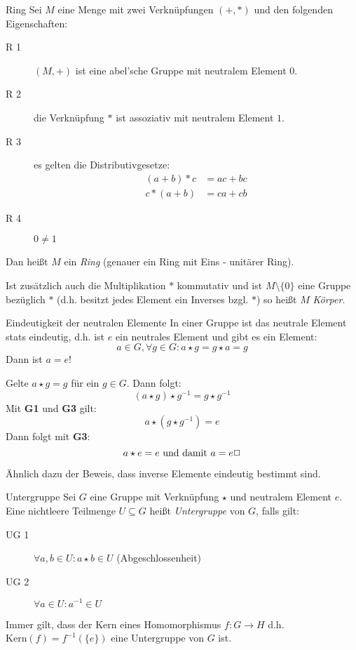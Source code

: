 \begin{definition}{Ring}
	Sei $M$ eine Menge mit zwei Verknüpfungen $(+,*)$ und den folgenden Eigenschaften:
	\begin{description}
	  \item[R 1] $(M,+)$ ist eine abel'sche Gruppe mit neutralem Element $0$.
	  \item[R 2] die Verknüpfung $*$ ist assoziativ mit neutralem Element $1$.
	  \item[R 3] es gelten die Distributivgesetze:
	  \begin{align*}
	    (a+b)* c&=ac+bc\\
	    c*(a+b)&=ca+cb
	  \end{align*}
	  \item[R 4] $0\neq 1$
	\end{description}
	Dan heißt $M$ ein \emph{Ring} (genauer ein Ring mit Eins - unitärer Ring).

\end{definition}

Ist zusätzlich auch die Multiplikation $*$ kommutativ und ist $M\setminus\{0\}$ eine Gruppe bezüglich $*$ (d.h. besitzt jedes Element ein Inverses bzgl. $*$) so heißt $M$ \emph{Körper}.
\par

\begin{satz}{Eindeutigkeit der neutralen Elemente}
  In einer Gruppe ist das neutrale Element stats eindeutig, d.h. ist $e$ ein neutrales Element und gibt es ein Element:
  \begin{equation*}
    a\in G, \forall g\in G : a\star g = g\star a = g
  \end{equation*}
  Dann ist $a = e$!
\end{satz}


\beweis
Gelte $a\star g = g$ für ein $g\in G$. Dann folgt:
\begin{equation*}
  (a\star g)\star g^{-1}=g\star g^{-1}
\end{equation*}
Mit \textbf{G1} und \textbf{G3} gilt:
\begin{equation*}
  a\star (g\star g^{-1})=e
\end{equation*}
Dann folgt mit \textbf{G3}:
\begin{equation*}
  a\star e=e \text{ und damit } a=e \hfill\Box
\end{equation*}

\bemerkung
Ähnlich dazu der Beweis, dass inverse Elemente eindeutig bestimmt sind.


\begin{definition}{Untergruppe}
	Sei $G$ eine Gruppe mit Verknüpfung $\star$ und neutralem Element $e$.\\
	Eine nichtleere Teilmenge $U\subseteq G$ heißt \emph{Untergruppe} von $G$, falls gilt:
	\begin{description}
	  \item[UG 1] $\forall a,b\in U : a\star b\in U$ (Abgeschlossenheit)
	  \item[UG 2] $\forall a\in U : a^{-1}\in U$
	\end{description}
\end{definition}

Immer gilt, dass der Kern eines Homomorphismus $f:G \rightarrow H$ d.h. $\mathrm{Kern}(f)=f^{-1}(\{e\})$  eine Untergruppe von $G$ ist.
